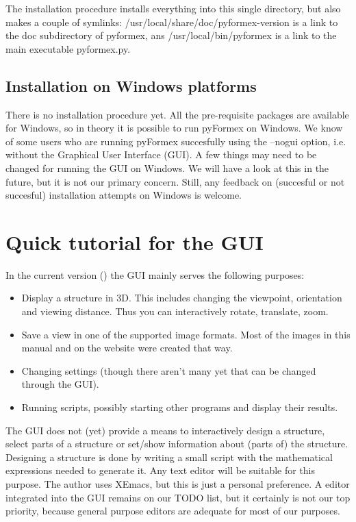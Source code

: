 The installation procedure installs everything into this single directory, but also makes a couple of symlinks:
/usr/local/share/doc/pyformex-version is a link to the doc subdirectory of pyformex, ans /usr/local/bin/pyformex is a link to the main executable pyformex.py.


\subsection{Installation on Windows platforms}
\label{sec:installation-windows}
There is no installation procedure yet. All the pre-requisite packages are available for Windows, so in theory it is possible to run pyFormex on Windows. We know of some users who are running pyFormex succesfully using the --nogui option, i.e. without the Graphical User Interface (GUI).  
A few things may need to be changed for running the GUI on Windows. We will have a look at this in the future, but it is not our primary concern.
Still, any feedback on (succesful or not succesful) installation attempts on Windows is welcome.


\section{Quick tutorial for the \pyformex{} GUI}
\label{sec:gui-tutorial}
In the current version () the GUI mainly serves the following purposes:
\begin{itemize}
\item Display a structure in 3D. This includes changing the viewpoint, orientation and viewing distance. Thus you can interactively rotate, translate, zoom.
\item Save a view in one of the supported image formats. Most of the images in this manual and on the \pyformex{} website were created that way. 
\item Changing \pyformex settings (though there aren't many yet that can be changed through the GUI).
\item Running \pyformex scripts, possibly starting other programs and display their results.
\end{itemize}

The GUI does not (yet) provide a means to interactively design a structure, select parts of a structure or set/show information about (parts of) the structure. Designing a structure is done by writing a small script with the mathematical expressions needed to generate it. Any text editor will be suitable for this purpose. The author uses XEmacs, but this is just a personal preference. 
A \pyformex editor integrated into the GUI remains on our TODO list, but it certainly is not our top priority, because general purpose editors are adequate for most of our purposes. 

